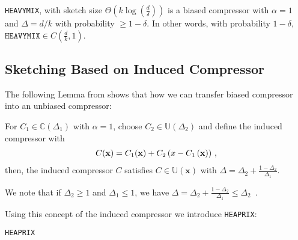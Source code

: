 \documentclass[review,onefignum,onetabnum]{siamart190516}
\begin{document}
\begin{lemma}
\texttt{HEAVYMIX}, with sketch size $\Theta\left(k\log\left(\frac{d}{\delta}\right)\right)$ is a biased compressor with $\alpha=1$ and  $\Delta=d/k$ with probability $\geq1-\delta$. In other words, with probability $1-\delta$, $\texttt{HEAVYMIX}\in C(\frac{d}{k},1)$. 
\end{lemma}
\subsection{Sketching Based on Induced Compressor}
The following Lemma from \cite{horvath2020better} shows that how we can transfer biased compressor into an unbiased compressor: 
\begin{lemma}\label{lemm:induced_compress}
For $C_1\in \mathbb{C}(\Delta_1)$ with $\alpha=1$, choose $C_2\in \mathbb{U}(\Delta_2)$ and define the induced compressor with
\begin{align}\notag
    C(\mathbf{x})=C_1(\mathbf{x})+C_2\left(x-C_1\left(\mathbf{x}\right)\right)\, ,
\end{align}
then, the induced compressor $C$ satisfies $C\in\mathbb{U}(\mathbf{x})$ with $\Delta=\Delta_2+\frac{1-\Delta_2}{\Delta_1}$.
\end{lemma}
\begin{remark}
We note that if $\Delta_2\geq 1$ and $\Delta_1\leq 1$, we have $\Delta=\Delta_2+\frac{1-\Delta_2}{\Delta_1}\leq \Delta_2$\, .
\end{remark}
Using this concept of the induced compressor we introduce \texttt{HEAPRIX}:
\begin{algorithm}[H]
\caption{\texttt{HEAPRIX} }\label{alg:heaprix}
\begin{algorithmic}[1]
\end{algorithmic}
\end{algorithm}
\end{document}
